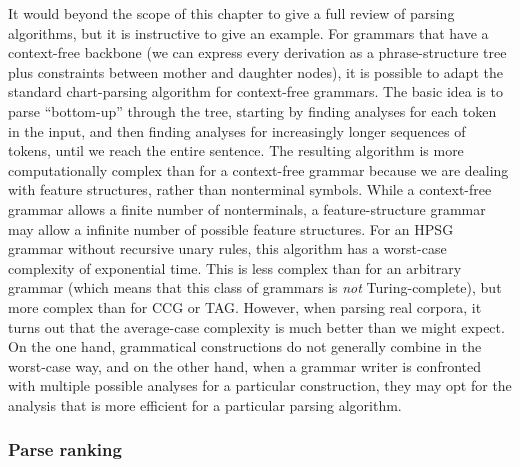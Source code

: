 \documentclass[output=paper]{langsci/langscibook}
\begin{document}
It would beyond the scope of this chapter
to give a full review of parsing algorithms,
but it is instructive to give an example.
For grammars that have a context-free backbone
(we can express every derivation as a phrase-structure tree
plus constraints between mother and daughter nodes),
it is possible to adapt the standard chart-parsing algorithm for context-free grammars.
The basic idea is to parse ``bottom-up'' through the tree,
starting by finding analyses for each token in the input,
and then finding analyses for increasingly longer sequences of tokens,
until we reach the entire sentence.
The resulting algorithm is more computationally complex than for a context-free grammar
because we are dealing with feature structures, rather than nonterminal symbols.
While a context-free grammar allows a finite number of nonterminals,
a feature-structure grammar may allow a infinite number of possible feature structures.
For an HPSG grammar without recursive unary rules,
this algorithm has a worst-case complexity of exponential time.
This is less complex than for an arbitrary grammar
(which means that this class of grammars is \emph{not} Turing-complete),
but more complex than for CCG or TAG.
However, when parsing real corpora,
it turns out that the average-case complexity is much better than we might expect.
On the one hand, grammatical constructions do not generally combine in the worst-case way,
and on the other hand, when a grammar writer is confronted
with multiple possible analyses for a particular construction,
they may opt for the analysis that is more efficient for a particular parsing algorithm.



\subsubsection{Parse ranking}
\label{cl:prac:rank}
\end{document}
